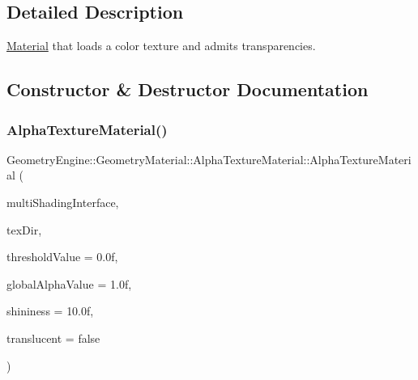 \subsection{Detailed Description}
\mbox{\hyperlink{class_geometry_engine_1_1_geometry_material_1_1_material}{Material}} that loads a color texture and admits transparencies. 

\subsection{Constructor \& Destructor Documentation}
\mbox{\label{class_geometry_engine_1_1_geometry_material_1_1_alpha_texture_material_a7ab1f51006d0b2613ef4be29c6e07c2c}} 
\subsubsection{\texorpdfstring{AlphaTextureMaterial()}{AlphaTextureMaterial()}\hspace{0.1cm}{\footnotesize\ttfamily [1/3]}}
{\footnotesize\ttfamily Geometry\+Engine\+::\+Geometry\+Material\+::\+Alpha\+Texture\+Material\+::\+Alpha\+Texture\+Material (\begin{DoxyParamCaption}\item[{const \mbox{\hyperlink{class_geometry_engine_1_1_custom_shading_1_1_multi_shading_interface}{Custom\+Shading\+::\+Multi\+Shading\+Interface}} $\ast$const}]{multi\+Shading\+Interface,  }\item[{const std\+::string \&}]{tex\+Dir,  }\item[{float}]{threshold\+Value = {\ttfamily 0.0f},  }\item[{float}]{global\+Alpha\+Value = {\ttfamily 1.0f},  }\item[{float}]{shininess = {\ttfamily 10.0f},  }\item[{bool}]{translucent = {\ttfamily false} }\end{DoxyParamCaption})}

